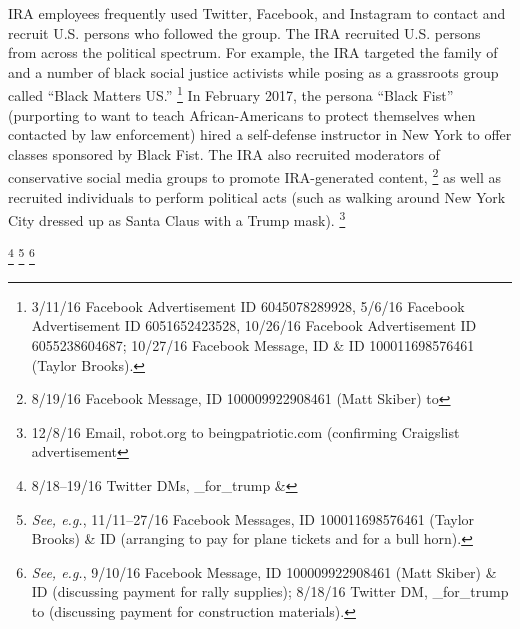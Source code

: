 IRA employees frequently used  Twitter, Facebook, and Instagram to contact and recruit U.S. persons who followed the group.
The IRA recruited U.S. persons from across the political spectrum.
For example, the IRA targeted the family of  and a number of black social justice activists while posing as a grassroots group called ``Black Matters US\null.''%
\footnote{3/11/16 Facebook Advertisement ID 6045078289928, 5/6/16 Facebook Advertisement ID 6051652423528, 10/26/16 Facebook Advertisement ID 6055238604687;
10/27/16 Facebook Message, ID  \& ID 100011698576461 (Taylor Brooks).}
In February 2017, the persona ``Black Fist'' (purporting to want to teach African-Americans to protect themselves when contacted by law enforcement) hired a self-defense instructor in New York to offer classes sponsored by Black Fist.
The IRA also recruited moderators of conservative social media groups to promote IRA-generated content,%
\footnote{8/19/16 Facebook Message, ID 100009922908461 (Matt Skiber) to }
as well as recruited individuals to perform political acts (such as walking around New York City dressed up as Santa Claus with a Trump mask).%
\footnote{12/8/16 Email, robot\@craigslist.org to beingpatriotic\@gmail.com (confirming Craigslist advertisement}

\footnote{8/18--19/16 Twitter DMs, \@march\_for\_trump \& }
\footnote{\textit{See, e.g.}, 11/11--27/16 Facebook Messages, ID 100011698576461 (Taylor Brooks) \& ID  (arranging to pay for plane tickets and for a bull horn).
}
\footnote{\textit{See, e.g.}, 9/10/16 Facebook Message, ID 100009922908461 (Matt Skiber) \& ID  (discussing payment for rally supplies);
8/18/16 Twitter DM, \@march\_for\_trump to  (discussing payment for construction materials).}

